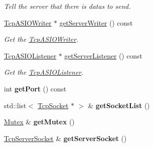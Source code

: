 \begin{DoxyCompactItemize}
\begin{DoxyCompactList}\small\item\em Tell the server that there is datas to send. \end{DoxyCompactList}\item 
\hyperlink{classmognetwork_1_1_tcp_a_s_i_o_writer}{Tcp\-A\-S\-I\-O\-Writer} $\ast$ \hyperlink{classmognetwork_1_1_tcp_a_s_i_o_server_a55e84839aad1572d36a0c7fcbc1fd84d}{get\-Server\-Writer} () const 
\begin{DoxyCompactList}\small\item\em Get the \hyperlink{classmognetwork_1_1_tcp_a_s_i_o_writer}{Tcp\-A\-S\-I\-O\-Writer}. \end{DoxyCompactList}\item 
\hyperlink{classmognetwork_1_1_tcp_a_s_i_o_listener}{Tcp\-A\-S\-I\-O\-Listener} $\ast$ \hyperlink{classmognetwork_1_1_tcp_a_s_i_o_server_afb30f505e64de27887abec2e8cfd50ff}{get\-Server\-Listener} () const 
\begin{DoxyCompactList}\small\item\em Get the \hyperlink{classmognetwork_1_1_tcp_a_s_i_o_listener}{Tcp\-A\-S\-I\-O\-Listener}. \end{DoxyCompactList}\item 
\hypertarget{classmognetwork_1_1_tcp_a_s_i_o_server_a2f16d1d17fa0924ae3374b5a0b2ddbb9}{int {\bfseries get\-Port} () const }\label{classmognetwork_1_1_tcp_a_s_i_o_server_a2f16d1d17fa0924ae3374b5a0b2ddbb9}

\item 
\hypertarget{classmognetwork_1_1_tcp_a_s_i_o_server_a8911b09c4fca058430511cdbb6a6170e}{std\-::list$<$ \hyperlink{classmognetwork_1_1_tcp_socket}{Tcp\-Socket} $\ast$ $>$ \& {\bfseries get\-Socket\-List} ()}\label{classmognetwork_1_1_tcp_a_s_i_o_server_a8911b09c4fca058430511cdbb6a6170e}

\item 
\hypertarget{classmognetwork_1_1_tcp_a_s_i_o_server_a00055c3b37b05302be695888727fb854}{\hyperlink{classmognetwork_1_1_mutex}{Mutex} \& {\bfseries get\-Mutex} ()}\label{classmognetwork_1_1_tcp_a_s_i_o_server_a00055c3b37b05302be695888727fb854}

\item 
\hypertarget{classmognetwork_1_1_tcp_a_s_i_o_server_a19d509e35531993f29f5d96d5a532b34}{\hyperlink{classmognetwork_1_1_tcp_server_socket}{Tcp\-Server\-Socket} \& {\bfseries get\-Server\-Socket} ()}\label{classmognetwork_1_1_tcp_a_s_i_o_server_a19d509e35531993f29f5d96d5a532b34}


\end{DoxyCompactItemize}
